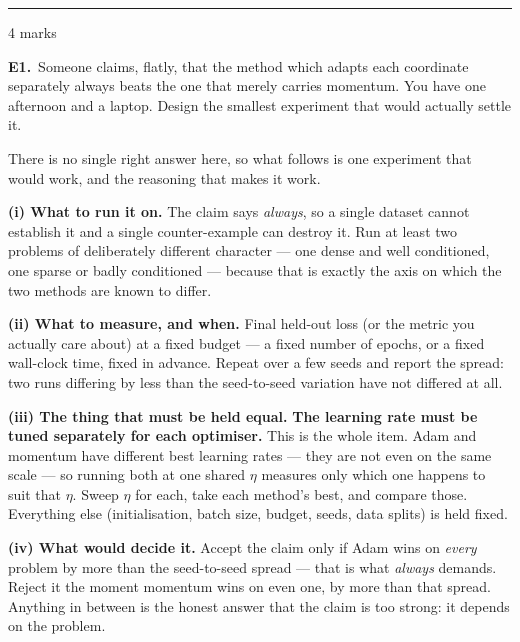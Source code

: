 \documentclass[10pt,a4paper]{article}
\newcommand{\parthead}[2]{\vspace{2pt}\noindent\rule{\linewidth}{0.4pt}\par\vspace{2pt}%
  \noindent{\bfseries Part #1}\hfill{\small #2}\par\vspace{1pt}}
\begin{document}
\newpage

\parthead{E --- Reasoning}{4 marks}

\textbf{E1.}\ Someone claims, flatly, that the method which adapts each coordinate separately always beats the one
that merely carries momentum. You have one afternoon and a laptop. Design the smallest experiment that would
actually settle it.

\vspace{4pt}

There is no single right answer here, so what follows is one experiment that would work, and the reasoning that makes it work.\par\vspace{1mm}\textbf{(i) What to run it on.} The claim says \emph{always}, so a single dataset cannot establish it and a single counter-example can destroy it. Run at least two problems of deliberately different character --- one dense and well conditioned, one sparse or badly conditioned --- because that is exactly the axis on which the two methods are known to differ.\par\vspace{1mm}\textbf{(ii) What to measure, and when.} Final held-out loss (or the metric you actually care about) at a fixed budget --- a fixed number of epochs, or a fixed wall-clock time, fixed in advance. Repeat over a few seeds and report the spread: two runs differing by less than the seed-to-seed variation have not differed at all.\par\vspace{1mm}\textbf{(iii) The thing that must be held equal.} \textbf{The learning rate must be tuned separately for each optimiser.} This is the whole item. Adam and momentum have different best learning rates --- they are not even on the same scale --- so running both at one shared $\eta$ measures only which one happens to suit that $\eta$. Sweep $\eta$ for each, take each method's best, and compare those. Everything else (initialisation, batch size, budget, seeds, data splits) is held fixed.\par\vspace{1mm}\textbf{(iv) What would decide it.} Accept the claim only if Adam wins on \emph{every} problem by more than the seed-to-seed spread --- that is what \emph{always} demands. Reject it the moment momentum wins on even one, by more than that spread. Anything in between is the honest answer that the claim is too strong: it depends on the problem.

\vfill
\end{document}
